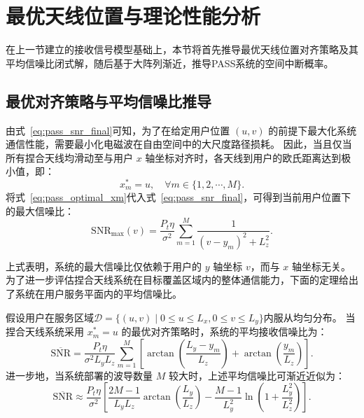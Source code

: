 \section{最优天线位置与理论性能分析}\label{sec:pass_performance}

在上一节建立的接收信号模型基础上，本节将首先推导最优天线位置对齐策略及其平均信噪比闭式解，随后基于大阵列渐近，推导PASS系统的空间中断概率。

\subsection{最优对齐策略与平均信噪比推导}

由式~\eqref{eq:pass_snr_final}可知，为了在给定用户位置 $(u, v)$ 的前提下最大化系统通信性能，需要最小化电磁波在自由空间中的大尺度路径损耗。
因此，当且仅当所有捏合天线均滑动至与用户 $x$ 轴坐标对齐时，各天线到用户的欧氏距离达到极小值，即：
\begin{equation}\label{eq:pass_optimal_xm}
	x_m^\ast = u, \quad \forall m \in \{1, 2, \cdots, M\}.
\end{equation}
将式~\eqref{eq:pass_optimal_xm}代入式~\eqref{eq:pass_snr_final}，可得到当前用户位置下的最大信噪比：
\begin{equation}\label{eq:pass_snr_max}
	\mathrm{SNR}_{\max}(v) = \frac{P_t \eta}{\sigma^2} \sum_{m=1}^M \frac{1}{(v - y_m)^2 + L_z^2}.
\end{equation}

上式表明，系统的最大信噪比仅依赖于用户的 $y$ 轴坐标 $v$，而与 $x$ 轴坐标无关。为了进一步评估捏合天线系统在目标覆盖区域内的整体通信能力，下面的定理给出了系统在用户服务平面内的平均信噪比。

\begin{theorem}\label{the:pass_avg_snr}
	假设用户在服务区域$\mathcal{D} = \{ (u,v) \mid 0 \le u \le L_x, 0 \le v \le L_y \}$内服从均匀分布。
	当捏合天线系统采用 $x_m^\ast = u$ 的最优对齐策略时，系统的平均接收信噪比为：
	\begin{equation}\label{eq:pass_avg_snr}
		\overline{\mathrm{SNR}} = \frac{P_t \eta}{\sigma^2 L_y L_z} \sum_{m=1}^M \left[ \arctan\left(\frac{L_y - y_m}{L_z}\right) + \arctan\left(\frac{y_m}{L_z}\right) \right].
	\end{equation}
	进一步地，当系统部署的波导数量 $M$ 较大时，上述平均信噪比可渐近近似为：
	\begin{equation}\label{eq:pass_avg_snr_approx}
		\overline{\mathrm{SNR}} \approx \frac{P_t \eta}{\sigma^2} \left[ \frac{2M-1}{L_y L_z} \arctan\left(\frac{L_y}{L_z}\right) - \frac{M-1}{L_y^2} \ln\left(1 + \frac{L_y^2}{L_z^2}\right) \right].
	\end{equation}
\end{theorem}


